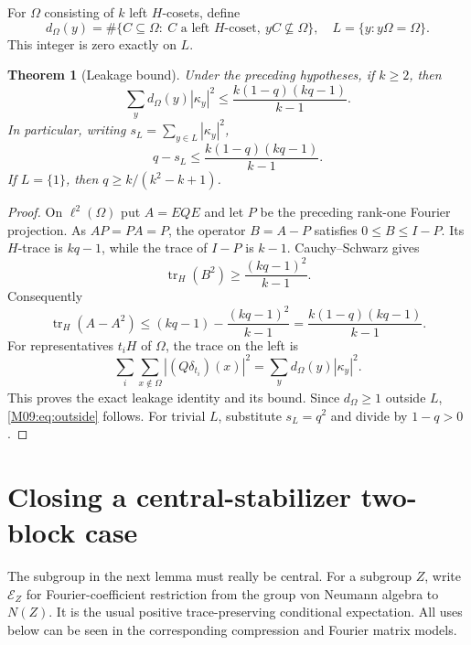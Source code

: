 \documentclass[11pt,a4paper,oneside]{report}
\newtheorem{theorem}{Theorem}[section]
\theoremstyle{definition}
\theoremstyle{remark}
\begin{document}
For $\Omega$ consisting of $k$ left $H$-cosets, define
\[
d_\Omega(y)=\#\{C\subseteq\Omega:\ C\text{ a left }H\text{-coset},\ yC\not\subseteq\Omega\},
\quad L=\{y:y\Omega=\Omega\}.
\]
This integer is zero exactly on $L$.
\begin{theorem}[Leakage bound]\label{M09:thm:leak}
Under the preceding hypotheses, if $k\ge2$, then
\begin{equation}\label{M09:eq:leak}
\sum_y d_\Omega(y)|\kappa_y|^2
\le\frac{k(1-q)(kq-1)}{k-1}.
\end{equation}
In particular, writing $s_L=\sum_{y\in L}|\kappa_y|^2$,
\begin{equation}\label{M09:eq:outside}
q-s_L\le\frac{k(1-q)(kq-1)}{k-1}.
\end{equation}
If $L=\{1\}$, then $q\ge k/(k^2-k+1)$.
\end{theorem}
\begin{proof}
On $\ell^2(\Omega)$ put $A=EQE$ and let $P$ be the preceding
rank-one Fourier projection. As $AP=PA=P$, the operator
$B=A-P$ satisfies $0\le B\le I-P$. Its $H$-trace is $kq-1$,
while the trace of $I-P$ is $k-1$. Cauchy--Schwarz gives
\[
\operatorname{tr}_H(B^2)\ge\frac{(kq-1)^2}{k-1}.
\]
Consequently
\[
\operatorname{tr}_H(A-A^2)
\le (kq-1)-\frac{(kq-1)^2}{k-1}
=\frac{k(1-q)(kq-1)}{k-1}.
\]
For representatives $t_iH$ of $\Omega$, the trace on the left is
\[
\sum_i\sum_{x\notin\Omega}|(Q\delta_{t_i})(x)|^2
=\sum_y d_\Omega(y)|\kappa_y|^2.
\]
This proves the exact leakage identity and its bound. Since
$d_\Omega\ge1$ outside $L$, \eqref{M09:eq:outside} follows.
For trivial $L$, substitute $s_L=q^2$ and divide by $1-q>0$.
\end{proof}

\section{Closing a central-stabilizer two-block case}\label{M09:sec:central}
The subgroup in the next lemma must really be central.
For a subgroup $Z$, write $\mathcal E_Z$ for Fourier-coefficient
restriction from the group von Neumann algebra to $N(Z)$.
It is the usual positive trace-preserving conditional expectation.
All uses below can be seen in the corresponding compression
and Fourier matrix models.
\end{document}
